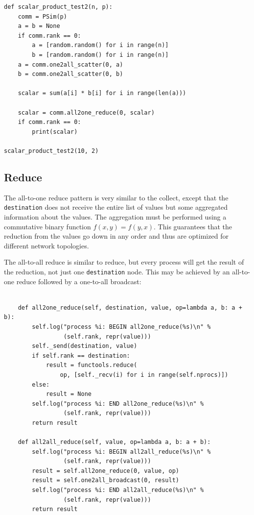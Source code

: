 \documentclass[justified, sixbynine]{tufte-book}
\def\ft{\small\tt}
\theoremstyle{plain}%
\newtheorem * {corollary}{Corollary}
\theoremstyle{definition}
\theoremstyle{remark}
\newtheorem * {remark}{Remark}
\newtheorem * {note}{Note}
\begin{document}
\begin{fullwidth}
\begin{lstlisting}[caption={in file: {\ft psim\_scalar2.py}}]
def scalar_product_test2(n, p):
    comm = PSim(p)
    a = b = None
    if comm.rank == 0:
        a = [random.random() for i in range(n)]
        b = [random.random() for i in range(n)]
    a = comm.one2all_scatter(0, a)
    b = comm.one2all_scatter(0, b)

    scalar = sum(a[i] * b[i] for i in range(len(a)))

    scalar = comm.all2one_reduce(0, scalar)
    if comm.rank == 0:
        print(scalar)

scalar_product_test2(10, 2)
\end{lstlisting}

\goodbreak\subsection{Reduce}

The all-to-one reduce pattern is very similar to the collect, except that the {\ft destination} does not receive the entire list of values but some aggregated information about the values. The aggregation must be performed using a commutative binary function $f(x, y)=f(y, x)$. This guarantees that the reduction from the values go down in any order and thus are optimized for different network topologies.

The all-to-all reduce is similar to reduce, but every process will get the result of the reduction, not just one {\ft destination} node. This may be achieved by an all-to-one reduce followed by a one-to-all broadcast:

\begin{lstlisting}[caption={in file: {\ft psim.py}}]

    def all2one_reduce(self, destination, value, op=lambda a, b: a + b):
        self.log("process %i: BEGIN all2one_reduce(%s)\n" %
                 (self.rank, repr(value)))
        self._send(destination, value)
        if self.rank == destination:
            result = functools.reduce(
                op, [self._recv(i) for i in range(self.nprocs)])
        else:
            result = None
        self.log("process %i: END all2one_reduce(%s)\n" %
                 (self.rank, repr(value)))
        return result

    def all2all_reduce(self, value, op=lambda a, b: a + b):
        self.log("process %i: BEGIN all2all_reduce(%s)\n" %
                 (self.rank, repr(value)))
        result = self.all2one_reduce(0, value, op)
        result = self.one2all_broadcast(0, result)
        self.log("process %i: END all2all_reduce(%s)\n" %
                 (self.rank, repr(value)))
        return result
\end{lstlisting}


\end{fullwidth}
\end{document}
